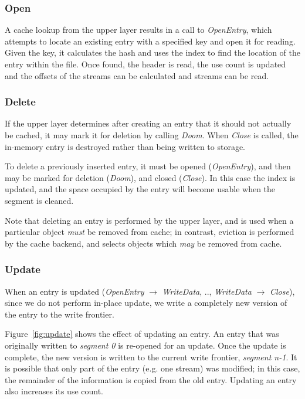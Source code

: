 \documentclass[letterpaper,twocolumn,10pt]{article}
\begin{document}
\subsubsection{Open}
A cache lookup from the upper layer results in a call to \emph{OpenEntry}, which
attempts to locate an existing entry with a specified key and open it for
reading.  Given the key, it calculates the hash and uses the index to find the
location of the entry within the file.  Once found, the header is read, the use
count is updated and the offsets of the streams can be calculated and streams
can be read.


\subsubsection{Delete}
If the upper layer determines after creating an entry that it should not
actually be cached, it may mark it for deletion by calling \emph{Doom}.  When
\emph{Close} is called, the in-memory entry is destroyed rather than being
written to storage.

To delete a previously inserted entry, it must be opened (\emph{OpenEntry}), and
then may be marked for deletion (\emph{Doom}), and closed (\emph{Close}).  In
this case the index is updated, and the space occupied by the entry will become
usable when the segment is cleaned.

Note that deleting an entry is performed by the upper layer, and is used when a
particular object \emph{must} be removed from cache; in contrast, eviction is
performed by the cache backend, and selects objects which \emph{may} be removed
from cache.


\subsubsection{Update}
When an entry is updated (\emph{OpenEntry} $\rightarrow$ \emph{WriteData}, ..,
\emph{WriteData} $\rightarrow$ \emph{Close}), since we do not perform in-place
update, we write a completely new version of the entry to the write frontier.

Figure~\ref{fig:update} shows the effect of updating an entry.  An entry that
was originally written to \emph{segment 0} is re-opened for an update.  Once the
update is complete, the new version is written to the current write frontier,
\emph{segment n-1}.  It is possible that only part of the entry (e.g. one
stream) was modified; in this case, the remainder of the information is copied
from the old entry.  Updating an entry also increases its use count.
\end{document}
